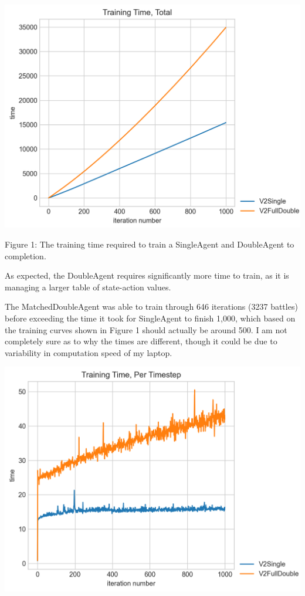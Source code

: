 \documentclass{article}
\begin{document}
	\includegraphics[scale=.3]{Total Training Time}

\quad	Figure 1: The training time required to train a SingleAgent and DoubleAgent to completion.

\quad As expected, the DoubleAgent requires significantly more time to train, as it is managing a larger table of state-action values.

\quad The MatchedDoubleAgent was able to train through 646 iterations (3237 battles) before exceeding the time it took for SingleAgent to finish 1,000, which based on the training curves shown in Figure 1 should actually be around 500. I am not completely sure as to why the times are different, though it could be due to variability in computation speed of my laptop.

	\includegraphics[scale=.3]{Per-Timestep Training Time}
\end{document}
